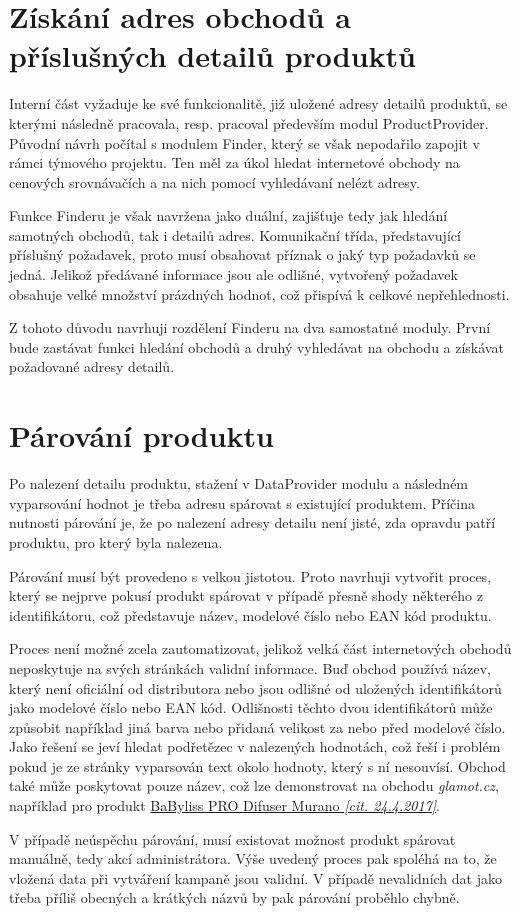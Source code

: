 \documentclass[thesis=B,czech]{FITthesis}[2012/06/26]
\begin{document}
\section{Získání adres obchodů a příslušných detailů produktů}
Interní část vyžaduje ke své funkcionalitě, již uložené adresy detailů produktů, se kterými následně pracovala, resp. pracoval
především modul ProductProvider. Původní návrh počítal s modulem Finder, který se však nepodařilo zapojit v rámci týmového projektu. Ten 
měl za úkol hledat internetové obchody na cenových srovnávačích a na nich pomocí vyhledávaní nelézt adresy.
\par
Funkce Finderu je však navržena jako duální, zajišťuje tedy jak hledání samotných obchodů, tak i detailů adres. Komunikační třída, představující příslušný požadavek, proto musí obsahovat příznak o jaký typ požadavků se jedná. Jelikož předávané informace
jsou ale odlišné, vytvořený požadavek obsahuje velké množství prázdných hodnot, což přispívá k celkové nepřehlednosti.
\par
Z tohoto důvodu navrhuji rozdělení Finderu na dva samostatné moduly. První bude zastávat funkci hledání obchodů a druhý
vyhledávat na obchodu a získávat požadované adresy detailů.


\section{Párování produktu}
Po nalezení detailu produktu, stažení v DataProvider modulu a následném vyparsování hodnot je třeba adresu spárovat s 
existující produktem. Příčina nutnosti párování je, že po nalezení adresy detailu není jisté, zda opravdu patří produktu, pro který 
byla nalezena. 
\par
Párování musí být provedeno s velkou jistotou. Proto navrhuji vytvořit proces, který se nejprve pokusí produkt spárovat v případě 
přesně shody některého z identifikátoru, což představuje název, modelové číslo nebo EAN kód produktu. 
\par
Proces není možné zcela zautomatizovat, jelikož velká část internetových obchodů neposkytuje na svých stránkách validní informace.\cite{hunka}
Buď obchod používá název, který není oficiální od distributora nebo jsou odlišné od uložených identifikátorů jako 
modelové číslo nebo EAN kód. Odlišnosti těchto dvou identifikátorů může způsobit například jiná barva nebo přidaná velikost za nebo před modelové
číslo. Jako řešení se jeví hledat podřetězec v nalezených hodnotách, což řeší i problém pokud je ze stránky vyparsován text okolo hodnoty, který s ní nesouvísí. Obchod také může poskytovat pouze název, což lze demonstrovat na obchodu \textit{glamot.cz}, například
pro produkt 
\href{https://www.glamot.cz/p/19128/difuzer-k-vysouseci-babyliss-pro-difuser-murano}{BaByliss PRO Difuser Murano \textit{[cit. 24.4.2017]}}.
\par
V případě neúspěchu párování, musí existovat možnost produkt spárovat manuálně, tedy akcí administrátora. 
Výše uvedený proces pak spoléhá na to, že vložená data při vytváření kampaně jsou validní. V případě nevalidních dat jako třeba
příliš obecných a krátkých názvů by pak párování proběhlo chybně.
\end{document}
